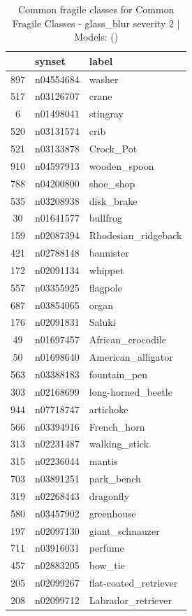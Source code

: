 \begin{table}
\caption{Common fragile classes for Common Fragile Classes - glass_blur severity 2 | Models: ()}
\label{tab:Common Fragile Classes - glass_blur severity 2_d41d8cd9}
\begin{tabular}{cll}
\toprule
 & synset & label \\
\midrule
897 & n04554684 & washer \\
517 & n03126707 & crane \\
6 & n01498041 & stingray \\
520 & n03131574 & crib \\
521 & n03133878 & Crock_Pot \\
910 & n04597913 & wooden_spoon \\
788 & n04200800 & shoe_shop \\
535 & n03208938 & disk_brake \\
30 & n01641577 & bullfrog \\
159 & n02087394 & Rhodesian_ridgeback \\
421 & n02788148 & bannister \\
172 & n02091134 & whippet \\
557 & n03355925 & flagpole \\
687 & n03854065 & organ \\
176 & n02091831 & Saluki \\
49 & n01697457 & African_crocodile \\
50 & n01698640 & American_alligator \\
563 & n03388183 & fountain_pen \\
303 & n02168699 & long-horned_beetle \\
944 & n07718747 & artichoke \\
566 & n03394916 & French_horn \\
313 & n02231487 & walking_stick \\
315 & n02236044 & mantis \\
703 & n03891251 & park_bench \\
319 & n02268443 & dragonfly \\
580 & n03457902 & greenhouse \\
197 & n02097130 & giant_schnauzer \\
711 & n03916031 & perfume \\
457 & n02883205 & bow_tie \\
205 & n02099267 & flat-coated_retriever \\
208 & n02099712 & Labrador_retriever \\

\end{tabular}
\end{table}

